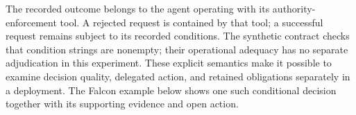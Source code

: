 The recorded outcome belongs to the agent operating with its authority-enforcement tool.
A rejected request is contained by that tool; a successful request remains subject to its
recorded conditions. The synthetic contract checks that condition strings are nonempty;
their operational adequacy has no separate adjudication in this experiment. These explicit
semantics make it possible to examine decision quality, delegated action, and retained
obligations separately in a deployment. The Falcon example below shows one such conditional
decision together with its supporting evidence and open action.
